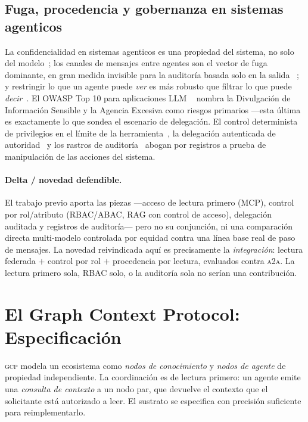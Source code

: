 \documentclass[conference,letterpaper]{IEEEtran}
\newcommand{\gcp}{\textsc{gcp}}
\newcommand{\ata}{\textsc{a2a}}
\begin{document}
\subsection{Fuga, procedencia y gobernanza en sistemas agenticos}
La confidencialidad en sistemas agenticos es una propiedad del sistema, no solo del
modelo~\citep{evertz2024whispers}; los canales de mensajes entre agentes son el vector de fuga
dominante, en gran medida invisible para la auditor\'ia basada solo en la salida
~\citep{elyagoubi2026agentleak}; y restringir lo que un agente puede \emph{ver} es m\'as robusto que
filtrar lo que puede \emph{decir}~\citep{bagdasarian2024airgap}. El OWASP Top 10 para aplicaciones LLM
~\citep{owasp2025} nombra la Divulgaci\'on de Informaci\'on Sensible y la Agencia Excesiva como
riesgos primarios ---esta \'ultima es exactamente lo que sondea el escenario de delegaci\'on. El
control determinista de privilegios en el l\'imite de la herramienta~\citep{shi2025progent}, la
delegaci\'on autenticada de autoridad~\citep{south2025delegation} y los rastros de
auditor\'ia~\citep{ojewale2025audit} abogan por registros a prueba de manipulaci\'on de las acciones
del sistema.

\paragraph{Delta / novedad defendible.} El trabajo previo aporta las piezas ---acceso de lectura
primero (MCP), control por rol/atributo (RBAC/ABAC, RAG con control de acceso), delegaci\'on auditada
y registros de auditor\'ia--- pero no su conjunci\'on, ni una comparaci\'on directa multi-modelo
controlada por equidad contra una l\'inea base real de paso de mensajes. La novedad reivindicada aqu\'i
es precisamente la \emph{integraci\'on}: lectura federada $+$ control por rol $+$ procedencia
por lectura, evaluados contra \ata{}. La lectura primero sola, RBAC solo, o la auditor\'ia sola no
ser\'ian una contribuci\'on.

\section{El Graph Context Protocol: Especificaci\'on}
\label{sec:arch}

\gcp{} modela un ecosistema como \emph{nodos de conocimiento} y \emph{nodos de agente} de propiedad
independiente. La coordinaci\'on es de lectura primero: un agente emite una \emph{consulta de
contexto} a un nodo par, que devuelve el contexto que el solicitante est\'a autorizado a leer.
El sustrato se especifica con precisi\'on suficiente para reimplementarlo.
\end{document}
